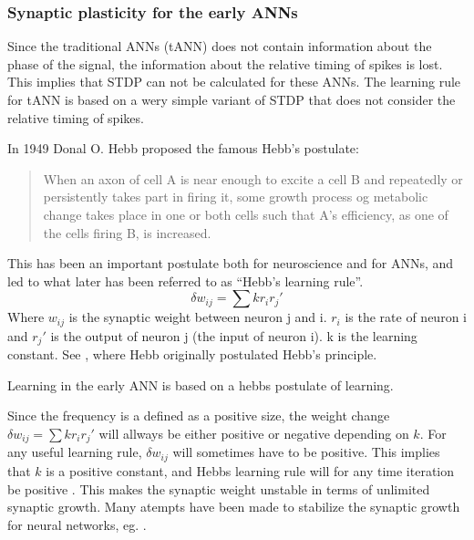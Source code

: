 
		\subsubsection{Synaptic plasticity for the early ANNs}
Since the traditional ANNs (tANN) does not contain information about the phase of the signal, the information about the relative timing of spikes is lost. This implies that STDP can not be calculated for these ANNs. 
The learning rule for tANN is based on a wery simple variant of STDP that does not consider the relative timing of spikes.

In 1949 Donal O. Hebb proposed the famous Hebb's postulate:
\begin{quote}
When an axon of cell A is near enough to excite a cell B and repeatedly or persistently takes part in firing it, some growth process og metabolic change takes place in one or both cells such that A's efficiency, as one of the cells firing B, is increased.\cite{Hebb1949Kap4}
\end{quote}

This has been an important postulate both for neuroscience and for ANNs, and led to what later has been referred to as ``Hebb's learning rule''.
\begin{equation}
	\delta w_{ij} = \sum{k r_i r_j'}
\end{equation}
Where $w_{ij}$ is the synaptic weight between neuron j and i. $r_i$ is the rate of neuron i and $r_j'$ is the output of neuron j (the input of neuron i). \mbox{k} is the learning constant. See \cite{Hebb1949Kap4}, where Hebb originally postulated Hebb's principle.

Learning in the early ANN is based on a hebbs postulate of learning. %

Since the frequency is a defined as a positive size, the weight change $\delta w_{ij} = \sum{k r_i r_j'}$ will allways be either positive or negative depending on $k$. 
For any useful learning rule, $\delta w_{ij}$ will sometimes have to be positive. This implies that $k$ is a positive constant, and Hebbs learning rule will for any time iteration be positive
 . This makes the synaptic weight unstable in terms of unlimited synaptic growth.
Many atempts have been made to stabilize the synaptic growth for neural networks, eg. \cite{hebbUstabilt}. %

